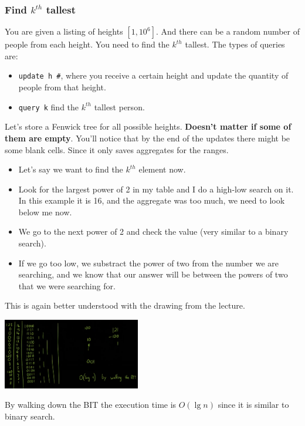 \documentclass{IEEEtran}
\begin{document}
      \subsubsection{Find $k^{th}$ tallest}
        You are given a listing of heights $[1,10^6]$. And there can be a random number of people from each height. You need to find the $k^{th}$ tallest. The types of queries are:
        \begin{itemize}
          \item \texttt{update h \#}, where you receive a certain height and update the quantity of people from that height. 
          \item \texttt{query k} find the $k^{th}$ tallest person.
        \end{itemize}
        \par Let's store a Fenwick tree for all possible heights. \textbf{Doesn't matter if some of them are empty}. You'll notice that by the end of the updates there might be some blank cells. Since it only saves aggregates for the ranges. 
        \begin{itemize}
          \item Let's say we want to find the $k^{th}$ element now. 
          \item Look for the largest power of 2 in my table and I do a high-low search on it. In this example it is 16, and the aggregate was too much, we need to look below me now.  
          \item We go to the next power of 2 and check the value (very similar to a binary search). 
          \item If we go too low, we substract the power of two from the number we are searching, and we know that our answer will be between the powers of two that we were searching for. 
        \end{itemize}
        \par This is again better understood with the drawing from the lecture.
        \begin{center}
          \includegraphics[width=0.45\textwidth]{kHeight.png}
        \end{center}
        \par By walking down the BIT the execution time is $O(\lg{n})$ since it is similar to binary search. 
\end{document}
